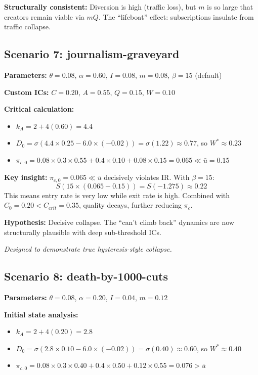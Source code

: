 \documentclass[11pt]{article}
\newcommand{\cmark}{\ding{51}}
\begin{document}
\textcolor{mygreen}{\cmark} \textbf{Structurally consistent:} Diversion is high (traffic loss), but $m$ is so large that creators remain viable via $mQ$. The ``lifeboat'' effect: subscriptions insulate from traffic collapse.

\subsection{Scenario 7: journalism-graveyard}
\textbf{Parameters:} $\theta=0.08$, $\alpha=0.60$, $I=0.08$, $m=0.08$, $\beta=15$ (default)

\textbf{Custom ICs:} $C=0.20$, $A=0.55$, $Q=0.15$, $W=0.10$

\textbf{Critical calculation:}
\begin{itemize}
    \item $k_A = 2 + 4(0.60) = 4.4$
    \item $D_0 = \sigma(4.4 \times 0.25 - 6.0 \times (-0.02)) = \sigma(1.22) \approx 0.77$, so $W^* \approx 0.23$
    \item $\pi_{c,0} = 0.08 \times 0.3 \times 0.55 + 0.4 \times 0.10 + 0.08 \times 0.15 = 0.065 \ll \bar{u} = 0.15$
\end{itemize}

\textbf{Key insight:} $\pi_{c,0} = 0.065 \ll \bar{u}$ decisively violates IR. With $\beta=15$:
\[
S(15 \times (0.065 - 0.15)) = S(-1.275) \approx 0.22
\]
This means entry rate is very low while exit rate is high. Combined with $C_0 = 0.20 < C_{crit} = 0.35$, quality decays, further reducing $\pi_c$.

\textcolor{myorange}{\textbf{Hypothesis:}} Decisive collapse. The ``can't climb back'' dynamics are now structurally plausible with deep sub-threshold ICs.

\textit{Designed to demonstrate true hysteresis-style collapse.}

\subsection{Scenario 8: death-by-1000-cuts}
\textbf{Parameters:} $\theta=0.08$, $\alpha=0.20$, $I=0.04$, $m=0.12$

\textbf{Initial state analysis:}
\begin{itemize}
    \item $k_A = 2 + 4(0.20) = 2.8$
    \item $D_0 = \sigma(2.8 \times 0.10 - 6.0 \times (-0.02)) = \sigma(0.40) \approx 0.60$, so $W^* \approx 0.40$
    \item $\pi_{c,0} = 0.08 \times 0.3 \times 0.40 + 0.4 \times 0.50 + 0.12 \times 0.55 = 0.076 > \bar{u}$
\end{itemize}
\end{document}

